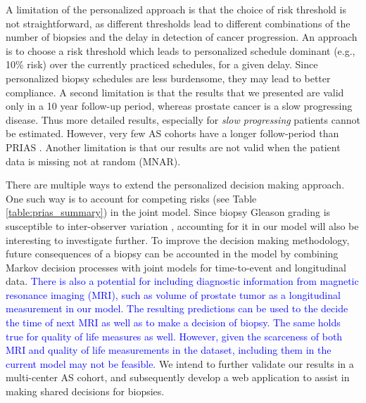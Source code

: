 A limitation of the personalized approach is that the choice of risk threshold is not straightforward, as different thresholds lead to different combinations of the number of biopsies and the delay in detection of cancer progression. An approach is to choose a risk threshold which leads to personalized schedule dominant (e.g., 10\% risk) over the currently practiced schedules, for a given delay. Since personalized biopsy schedules are less burdensome, they may lead to better compliance. A second limitation is that the results that we presented are valid only in a 10 year follow-up period, whereas prostate cancer is a slow progressing disease. Thus more detailed results, especially for \textit{slow progressing} patients cannot be estimated. However, very few AS cohorts have a longer follow-period than PRIAS \cite{bruinsma2016active}. Another limitation is that our results are not valid when the patient data is missing not at random (MNAR).

There are multiple ways to extend the personalized decision making approach. One such way is to account for competing risks (see Table \ref{table:prias_summary}) in the joint model. Since biopsy Gleason grading is susceptible to inter-observer variation \cite{coley2017}, accounting for it in our model will also be interesting to investigate further. To improve the decision making methodology, future consequences of a biopsy can be accounted in the model by combining Markov decision processes with joint models for time-to-event and longitudinal data. \textcolor{blue}{There is also a potential for including diagnostic information from magnetic resonance imaging (MRI), such as volume of prostate tumor as a longitudinal measurement in our model. The resulting predictions can be used to the decide the time of next MRI as well as to make a decision of biopsy. The same holds true for quality of life measures as well. However, given the scarceness of both MRI and quality of life measurements in the dataset, including them in the current model may not be feasible.} We intend to further validate our results in a multi-center AS cohort, and subsequently develop a web application to assist in making shared decisions for biopsies.